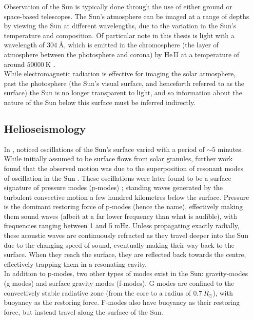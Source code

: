\documentclass[11pt,a4paper,onecolumn]{report}
\newcommand*\chem[1]{\ensuremath{\mathrm{#1}}}
\begin{document}
Observation of the Sun is typically done through the use of either ground or
space-based telescopes. The Sun's atmosphere can be imaged at a range of depths
by viewing the Sun at different wavelengths, due to the variation in the Sun's
temperature and composition. Of particular note in this thesis is light with a
wavelength of \(\SI{304}{\angstrom}\), which is emitted in the chromosphere (the
layer of atmosphere between the photosphere and corona) by \(\chem{He \, II}\)
at a temperature of around \(\SI{50000}{\kelvin}\)
\citep{herbert_friedman_solar_1962}. \\

While electromagnetic radiation is effective for imaging the solar atmosphere,
past the photosphere (the Sun's visual surface, and henceforth referred to as
the surface) the Sun is no longer transparent to light, and so information about
the nature of the Sun below this surface must be inferred indirectly. \\


%
\subsection{Helioseismology}
%
\label{sec:HSM}

In \citeyear{leighton_velocity_1962}, \citeauthor{leighton_velocity_1962}
noticed oscillations of the Sun's surface varied with a period of \(\sim
5\) minutes. While initially assumed to be surface flows from solar granules,
further work found that the observed motion was due to the superposition of
resonant modes of oscillation in the Sun \citep{ulrich_five-minute_1970}. These
oscillations were later found to be a surface signature of pressure modes
(p-modes) \citep{deubner_observations_1975}; standing waves generated by the
turbulent convective motion a few hundred kilometres below the surface. Pressure
is the dominant restoring force of p-modes (hence the name), effectively making
them sound waves (albeit at a far lower frequency than what is audible), with
frequencies ranging between 1 and 5 mHz. Unless propagating exactly radially,
these acoustic waves are continuously refracted as they travel deeper into the
Sun due to the changing speed of sound, eventually making their way back to the
surface. When they reach the surface, they are reflected back towards the
centre, effectively trapping them in a resonating cavity. \\

In addition to p-modes, two other types of modes exist in the Sun: gravity-modes
(g modes) and surface gravity modes (f-modes). G modes are confined to the
convectively stable radiative zone (from the core to a radius of $\SI{0.7}
{R_\odot}$), with buoyancy as the restoring force. F-modes also have buoyancy as
their restoring force, but instead travel along the surface of the Sun. \\
\end{document}
